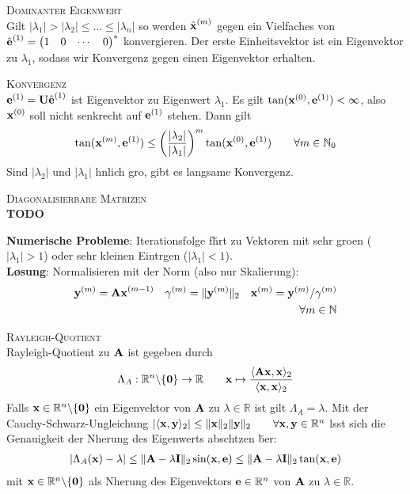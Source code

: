 \textsc{Dominanter Eigenwert}\\
Gilt $|\lambda_1| > |\lambda_2| \leq ... \leq |\lambda_n|$ so werden $\hat{\mbox{\bf x}}^{(m)}$ gegen ein Vielfaches von $\hat{\mbox{\bf e}}^{(1)} = \begin{pmatrix}
1 & 0 & \cdots & 0
\end{pmatrix}^*$
konvergieren. Der erste Einheitsvektor ist ein Eigenvektor zu $\lambda_1$, sodass wir Konvergenz gegen einen Eigenvektor erhalten. \vspace{0.2cm}

\textsc{Konvergenz}\\
$\mbox{\bf e}^{(1)} = \mbox{\bf U}\hat{\mbox{\bf e}}^{(1)}$ ist Eigenvektor zu Eigenwert $\lambda_1$. Es gilt $\tan(\mbox{\bf x}^{(0)}, \mbox{\bf e}^{(1)}) < \infty$, also $\mbox{\bf x}^{(0)}$ soll nicht senkrecht auf $\mbox{\bf e}^{(1)}$ stehen. Dann gilt 
\begin{align*}
\tan(\mbox{\bf x}^{(m)}, \mbox{\bf e}^{(1)}) \leq \left(\frac{|\lambda_2|}{|\lambda_1|}\right)^m \tan(\mbox{\bf x}^{(0)}, \mbox{\bf e}^{(1)}) \qquad \forall m \in \mathbb{N}_0
\end{align*}
Sind $|\lambda_2|$ und $|\lambda_1|$ \a hnlich gro\s  , gibt es langsame Konvergenz.

\textsc{Diagonalisierbare Matrizen}\\
\textbf{TODO}\vspace{0.2cm}


\textbf{Numerische Probleme}: Iterationsfolge f\u hrt zu Vektoren mit sehr gro\s en ($|\lambda_1|>1$) oder sehr kleinen Eintr\a gen ($|\lambda_1|<1$).\\
\textbf{L\o sung}: Normalisieren mit der Norm (also nur Skalierung):
\begin{align*}
\mbox{\bf y}^{(m)} = \mbox{\bf Ax}^{(m-1)} \quad \gamma^{(m)}= \Vert \mbox{\bf y}^{(m)} \Vert_2 \quad \mbox{\bf x}^{(m)} = \mbox{\bf y}^{(m)}/\gamma^{(m)} \\ \forall m\in \mathbb{N}
\end{align*}

\textsc{Rayleigh-Quotient}\\
Rayleigh-Quotient zu $\mbox{\bf A}$ ist gegeben durch
\begin{align*}
\Lambda_A: \mathbb{R}^{n} \backslash \{\mbox{\bf 0}\} \rightarrow \mathbb{R} \qquad \mbox{\bf x} \mapsto \frac{\langle \mbox{\bf Ax}, \mbox{\bf x} \rangle_2}{\langle \mbox{\bf x}, \mbox{\bf x} \rangle_2}
\end{align*}
Falls $\mbox{\bf x}\in \mathbb{R}^{n} \backslash \{\mbox{\bf 0}\}$ ein Eigenvektor von $\mbox{\bf A}$ zu $\lambda \in \mathbb{R}$ ist gilt $\Lambda_A = \lambda$. Mit der Cauchy-Schwarz-Ungleichung $|\langle \mbox{\bf x}, \mbox{\bf y} \rangle_2| \leq \Vert\mbox{\bf x} \Vert_2\Vert\mbox{\bf y} \Vert_2 \qquad \forall \mbox{\bf x},\mbox{\bf y} \in \mathbb{R}^{n}$ l\a sst sich die Genauigkeit der N\a herung des Eigenwerts absch\a tzen \u ber:
\begin{align*}
|\Lambda_A(\mbox{\bf x}) - \lambda| \leq \Vert \mbox{\bf A} - \lambda \mbox{\bf I} \Vert_2 \sin(\mbox{\bf x},\mbox{\bf e}) \leq \Vert \mbox{\bf A} -\lambda \mbox{\bf I} \Vert_2 \tan(\mbox{\bf x}, \mbox{\bf e})
\end{align*}
mit $\mbox{\bf x} \in \mathbb{R}^{n} \backslash \{\mbox{\bf 0}\}$ als N\a herung des Eigenvektors $\mbox{\bf e}\in \mathbb{R}^{n}$ von $\mbox{\bf A}$ zu $\lambda \in \mathbb{R}$.\\

